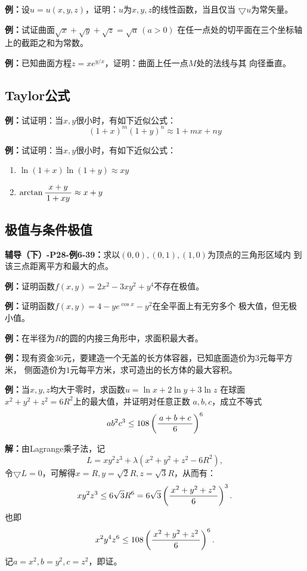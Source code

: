 {\bf 例：}设$u=u(x,y,z)$，证明：$u$为$x,y,z$的线性函数，当且仅当
$\bigtriangledown u$为常矢量。

{\bf 例：}试证曲面$\sqrt{x}+\sqrt y+\sqrt z=\sqrt a\,(a>0)$
在任一点处的切平面在三个坐标轴上的截距之和为常数。

{\bf 例：}已知曲面方程$z=xe^{y/x}$，证明：曲面上任一点$M$处的法线与其
向径垂直。

\subsection*{Taylor公式}

{\bf 例：}试证明：当$x,y$很小时，有如下近似公式：
$$(1+x)^m(1+y)^n\approx 1+mx+ny$$

{\bf 例：}试证明：当$x,y$很小时，有如下近似公式：
\begin{enumerate}[(1)]
  \setlength{\itemindent}{1cm}
  \item $\ln(1+x)\ln(1+y)\approx xy$
  \item $\arctan\displaystyle\frac{\,{x+y}\,}{\,{1+xy}\,}\approx x+y$
\end{enumerate}

\subsection*{极值与条件极值}

{\bf 辅导（下）-P28-例6-39：}求以$(0,0),(0,1),(1,0)$为顶点的三角形区域内
到该三点距离平方和最大的点。

{\bf 例：}证明函数$f(x,y)=2x^2-3xy^2+y^4$不存在极值。

{\bf 例：}证明函数$f(x,y)=4-ye^{\cos x}-y^2$在全平面上有无穷多个
极大值，但无极小值。

{\bf 例：}在半径为$R$的圆的内接三角形中，求面积最大者。

{\bf 例：}现有资金$36$元，要建造一个无盖的长方体容器，已知底面造价为$3$元每平方米，
侧面造价为$1$元每平方米，求可造出的长方体的最大容积。
		
{\bf 例：}当$x,y,z$均大于零时，求函数$u=\ln x+2\ln y+3\ln z$
在球面$x^2+y^2+z^2=6R^2$上的最大值，并证明对任意正数
$a,b,c$，成立不等式
$$ab^2c^3\leq 108\left(\displaystyle\frac{\,{a+b+c}\,}{\,{6}\,}\right)^6$$

{\bf 解：}由Lagrange乘子法，记
$$L=xy^2z^3+\lambda(x^2+y^2+z^2-6R^2),$$
令$\bigtriangledown L=0$，可解得$x=R,y=\sqrt2 R,z=\sqrt3 R$，从而有：
$$xy^2z^3\leq 6\sqrt 3R^6=6\sqrt 3\left(\displaystyle\frac{\,{x^2+y^2+z^2}\,}{\,{6}\,}\right)^3.$$
也即
$$x^2y^4z^6\leq 108\left(\displaystyle\frac{\,{x^2+y^2+z^2}\,}{\,{6}\,}\right)^6.$$
记$a=x^2,b=y^2,c=z^2$，即证。

